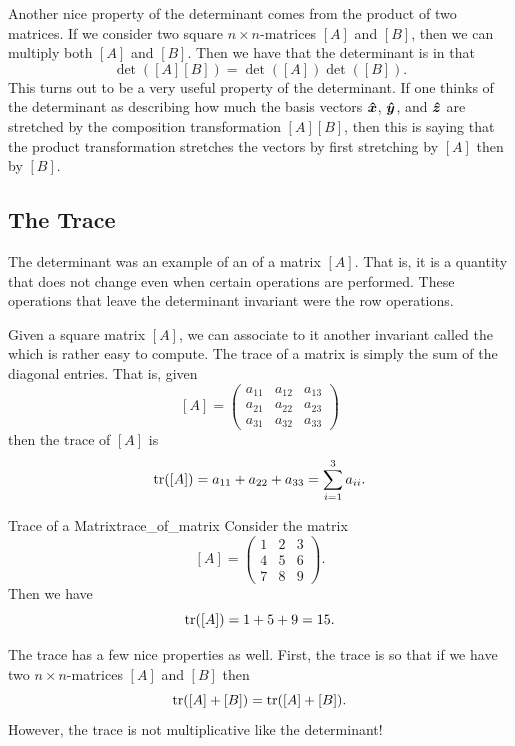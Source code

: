         Another nice property of the determinant comes from the product of two matrices.  If we consider two square $n\times n$-matrices $[A]$ and $[B]$, then we can multiply both $[A]$ and $[B]$. Then we have that the determinant is  in that
        \[
        \det([A][B])=\det([A])\det([B]).
        \]
        This turns out to be a very useful property of the determinant.  If one thinks of the determinant as describing how much the basis vectors $\boldsymbol{\hat{x}}$, $\boldsymbol{\hat{y}}$, and $\boldsymbol{\hat{z}}$ are stretched by the composition transformation $[A][B]$, then this is saying that the product transformation stretches the vectors by first stretching by $[A]$ then by $[B]$.
        
        \subsection{The Trace}
        
        The determinant was an example of an  of a matrix $[A]$. That is, it is a quantity that does not change even when certain operations are performed. These operations that leave the determinant invariant were the row operations.
        
        Given a square matrix $[A]$, we can associate to it another invariant called the  which is rather easy to compute.  The trace of a matrix is simply the sum of the diagonal entries. That is, given
        \[
        [A]=\begin{pmatrix} a_{11} & a_{12} & a_{13} \\ a_{21} & a_{22} & a_{23} \\ a_{31} & a_{32} & a_{33} \end{pmatrix}
        \]
        then the trace of $[A]$ is
        \[
        \mathrm{tr}([A]) = a_{11}+a_{22}+a_{33} = \sum_{i=1}^3 a_{ii}.
        \]
        
        \begin{ex}{Trace of a Matrix}{trace_of_matrix}
        Consider the matrix
        \[
        [A]=\begin{pmatrix} 1 & 2 & 3 \\ 4 & 5 & 6 \\ 7 & 8 & 9 \end{pmatrix}.
        \]
        Then we have
        \[
        \mathrm{tr}([A])=1 + 5 + 9 = 15.
        \]
        \end{ex}
        
        The trace has a few nice properties as well. First, the trace is  so that if we have two $n\times n$-matrices $[A]$ and $[B]$ then 
        \[
        \mathrm{tr}([A]+[B]) = \mathrm{tr}([A]+[B]).
        \]
        However, the trace is not multiplicative like the determinant!  
        
